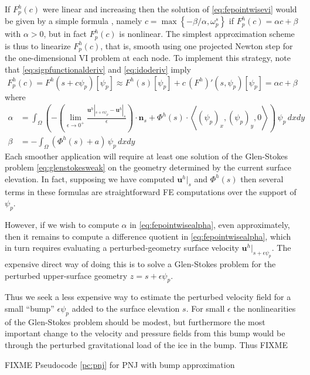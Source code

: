 \documentclass[letterpaper,final,12pt,reqno]{amsart}
\theoremstyle{claim}
\newcommand{\eps}{\epsilon}
\newcommand{\bn}{\mathbf{n}}
\newcommand{\bu}{\mathbf{u}}
\numberwithin{equation}{section}
\numberwithin{figure}{section}
\numberwithin{table}{section}
\numberwithin{theorem}{section}
\begin{document}
If $F_p^h(c)$ were linear and increasing then the solution of \eqref{eq:fepointwisevi} would be given by a simple formula \cite{GraeserKornhuber2009}, namely $c = \max\left\{-\beta/\alpha, \omega_p^s\right\}$ if $F_p^h(c) = \alpha c + \beta$ with $\alpha > 0$, but in fact $F_p^h(c)$ is nonlinear.  The simplest approximation scheme is thus to linearize $F_p^h(c)$, that is, smooth using one projected Newton step for the one-dimensional VI problem at each node.  To implement this strategy, note that \eqref{eq:sigpfunctionalderiv} and \eqref{eq:idoderiv} imply
\begin{equation}
F_p^h(c) = F^h(s+c\psi_p)[\psi_p] \approx F^h(s)[\psi_p] + c\, (F^h)'(s,\psi_p)[\psi_p] = \alpha c + \beta \label{eq:fepointwisefunctionalapprox}
\end{equation}
where
\begin{align}
\alpha &= \int_\Omega \left(- \left(\lim_{\eps\to 0^+} \frac{\bu^h|_{s+\eps \psi_p} - \bu^h|_s}{\eps}\right) \cdot \bn_s + \Phi^h(s) \cdot \left<(\psi_p)_x,(\psi_p)_y,0\right>\right)\, \psi_p \,dx dy \label{eq:fepointwisealpha} \\
\beta &= - \int_\Omega (\Phi^h(s) + a)\, \psi_p \,dx dy \label{eq:fepointwisebeta}
\end{align}
Each smoother application will require at least one solution of the Glen-Stokes problem \eqref{eq:glenstokesweak} on the geometry determined by the current surface elevation.  In fact, supposing we have computed $\bu^h|_s$ and $\Phi^h(s)$ then several terms in these formulas are straightforward FE computations over the support of $\psi_p$.

However, if we wish to compute $\alpha$ in \eqref{eq:fepointwisealpha}, even approximately, then it remains to compute a difference quotient in \eqref{eq:fepointwisealpha}, which in turn requires evaluating a perturbed-geometry surface velocity $\bu^h|_{s+\eps \psi_p}$.  The expensive direct way of doing this is to solve a Glen-Stokes problem for the perturbed upper-surface geometry $z=s + \eps \psi_p$.

Thus we seek a less expensive way to estimate the perturbed velocity field for a small ``bump'' $\eps\psi_p$ added to the surface elevation $s$.  For small $\eps$ the nonlinearities of the Glen-Stokes problem should be modest, but furthermore the most important change to the velocity and pressure fields from this bump would be through the perturbed gravitational load of the ice in the bump.  Thus FIXME

FIXME Pseudocode \ref{pc:pnj} for PNJ with bump approximation
\end{document}
